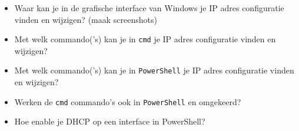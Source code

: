 \begin{itemize}
	\item Waar kan je in de grafische interface van Windows je IP adres configuratie vinden en wijzigen? (maak screenshots)
	\item Met welk commando('s) kan je in \texttt{cmd} je IP adres configuratie vinden en wijzigen?
	\item Met welk commando('s) kan je in \texttt{PowerShell} je IP adres configuratie vinden en wijzigen?
	\item Werken de  \texttt{cmd} commando's ook in \texttt{PowerShell} en omgekeerd?
	\item Hoe enable je DHCP op een interface in PowerShell?
\end{itemize}


